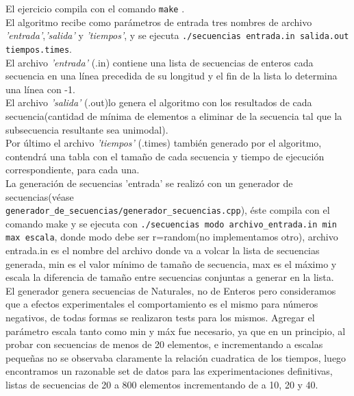 El ejercicio compila con el comando \texttt{make} .\\
El algoritmo recibe como parámetros de entrada tres nombres de archivo \emph{'entrada'},\emph{'salida'} y \emph{'tiempos'}, y se ejecuta \texttt{./secuencias entrada.in salida.out tiempos.times}.\\
El archivo \emph{'entrada'} (.in) contiene una lista de secuencias de enteros cada secuencia en una línea precedida de su longitud y el fin de la lista lo determina una línea con -1.\\
El archivo \emph{'salida'} (.out)lo genera el algoritmo con los resultados de cada secuencia(cantidad de mínima de elementos a eliminar de la secuencia tal que la subsecuencia resultante sea unimodal).\\
Por último el archivo \emph{'tiempos'} (.times)  también generado por el algoritmo, contendrá una tabla con el tamaño de cada secuencia y tiempo de ejecución correspondiente, para cada una.\\
La generación de secuencias 'entrada' se realizó con un generador de secuencias(véase\\ \texttt{generador\_de\_secuencias/generador\_secuencias.cpp}), éste compila con el comando make y se ejecuta con 
\texttt{./secuencias modo archivo\_entrada.in  min max escala}, donde modo debe ser r=random(no implementamos otro), archivo entrada.in es el nombre del archivo donde va a volcar la lista de secuencias generada, min es el valor mínimo de tamaño de secuencia, max es el máximo y escala la diferencia de tamaño entre secuencias conjuntas a generar en la lista.\\
El generador genera secuencias de Naturales, no de Enteros pero consideramos que a efectos experimentales el comportamiento es el mismo para números negativos, de todas formas se realizaron tests para los mismos.
Agregar el parámetro escala tanto como min y máx fue necesario, ya que en un principio, al probar con secuencias de menos de 20 elementos, e incrementando a escalas pequeñas no se observaba claramente la relación cuadratica de los tiempos, luego encontramos un razonable set de datos para las experimentaciones definitivas, listas de secuencias de 20 a 800 elementos incrementando de a 10, 20 y 40.  
